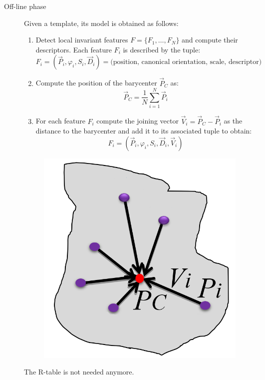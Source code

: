 \begin{description}
    \item[Off-line phase] 
        Given a template, its model is obtained as follows:
        \begin{enumerate}
            \item Detect local invariant features $F = \{ F_1, \dots, F_N \}$ and compute their descriptors.
                Each feature $F_i$ is described by the tuple:
                \[ F_i = (\vec{P}_i, \varphi_i, S_i, \vec{D}_i) = \text{(position, canonical orientation, scale, descriptor)} \]
            \item Compute the position of the barycenter $\vec{P}_C$ as:
                \[ \vec{P}_C = \frac{1}{N} \sum_{i=1}^{N} \vec{P}_i \]
            \item For each feature $F_i$ compute the joining vector $\vec{V}_i = \vec{P}_C - \vec{P}_i$ as the distance to the barycenter
                and add it to its associated tuple to obtain:
                \[ F_i = (\vec{P}_i, \varphi_i, S_i, \vec{D}_i, \vec{V}_i) \]
        \end{enumerate}

        \begin{figure}[H]
            \centering
            \includegraphics[width=0.2\linewidth]{./img/star_model_offline.png}
        \end{figure}

        \begin{remark}
            The R-table is not needed anymore.
        \end{remark}


\end{description}
